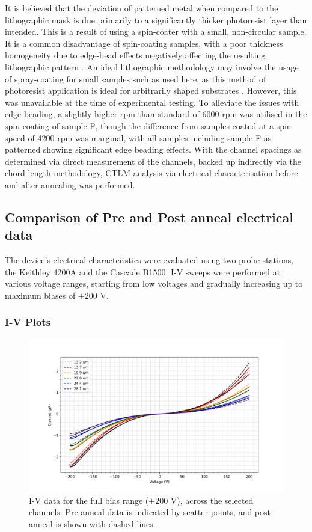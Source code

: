 \begin{refsection}
It is believed that the deviation of patterned metal when compared to the lithographic mask is due primarily to a significantly thicker photoresist layer than intended. This is a result of using a spin-coater with a small, non-circular sample. It is a common disadvantage of spin-coating samples, with a poor thickness homogeneity due to edge-bead effects negatively affecting the resulting lithographic pattern \cite{Liu2022, Weidner2023}. An ideal lithographic methodology may involve the usage of spray-coating for small samples such as used here, as this method of photoresist application is ideal for arbitrarily shaped substrates \cite{Yu2006}. However, this was unavailable at the time of experimental testing. To alleviate the issues with edge beading, a slightly higher rpm than standard of 6000 rpm was utilised in the spin coating of sample F, though the difference from samples coated at a spin speed of 4200 rpm was marginal, with all samples including sample F as patterned showing significant edge beading effects. With the channel spacings as determined via direct measurement of the channels, backed up indirectly via the chord length methodology, CTLM analysis via electrical characterisation before and after annealing was performed.

\subsection{Comparison of Pre and Post anneal electrical data}
The device's electrical characteristics were evaluated using two probe stations, the Keithley 4200A and the Cascade B1500. I-V sweeps were performed at various voltage ranges, starting from low voltages and gradually increasing up to maximum biases of $\pm$200 \si{\volt}.

\subsubsection{I-V Plots}
\label{subsubsec:ctlm_iv_plots}
\begin{figure}[H]
    \centering
    \includegraphics[width=\textwidth]{Chapter3/Figs/Raster/Sample F 2022/Comparison/lin_scale.png}
    \caption{I-V data for the full bias range ($\pm200$ \si{\volt}), across the selected channels. Pre-anneal data is indicated by scatter points, and post-anneal is shown with dashed lines.}
    \label{fig:comparison-iv-lin-200}
\end{figure}


\end{refsection}
